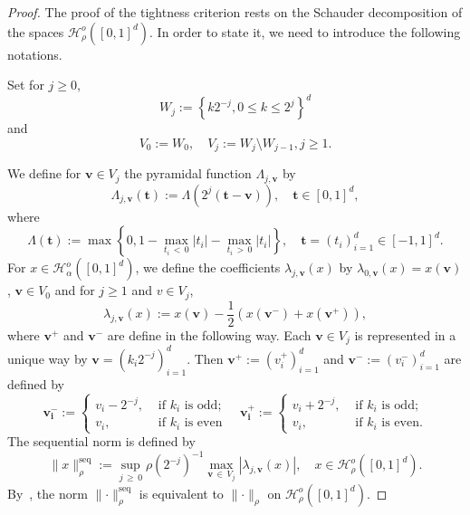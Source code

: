 \documentclass[AHL,Unicode,longabstracts,published]{cedram}
\newcommand{\clH}{\mathcal{H}}
\newcommand{\seq}{\mathrm{seq}}
\newcommand\abs[1]{|#1|}
\newcommand{\norm}[1]{\lVert #1\rVert}
\newcommand{\gr}[1]{\bm{#1}}
\begin{document}
\begin{proof}
The proof of the tightness criterion rests on the Schauder decomposition of the spaces $\clH_\rho^o\left([0,1]^d\right)$. In order to state it, we need to introduce the following notations.

Set for $j\geqslant 0$,
\begin{equation}
W_j:=\left\{k2^{-j},0\leq k\leq 2^j\right\}^d
\end{equation}
and
\begin{equation}
V_0:=W_0, \quad V_j:=W_j\setminus W_{j-1},j\geqslant 1.
\end{equation}

We define for $\gr{v}\in V_j$ the pyramidal function $\Lambda_{j,
\gr{v}}$ by
\begin{equation}
\Lambda_{j,\gr{v}}(\gr{t}):=\Lambda\left(2^j(\gr{t}-\gr{v})\right), \quad
\gr{t}\in [0,1]^d,
\end{equation}
where
\begin{equation}
\Lambda(\gr{t}):=\max\left\{0,1-\max_{t_i\,<\,0}\abs{t_i}-\max_{t_i\,>\,0}\abs{t_i}\right\},
\quad \gr{t}=(t_i)_{i=1}^d\in [-1,1]^d.
\end{equation}
For $x\in \clH_\alpha^o([0,1]^d)$, we define the coefficients $\lambda_{j,\gr{v}}(x)$ by $\lambda_{0,\gr{v}}(x)=x(\gr{v})$, $\gr{v}\in V_0$ and for $j\geqslant 1$ and $v\in V_j$,
\begin{equation}
\lambda_{j,\gr{v}}(x):=x\left(\gr{v}\right)-\frac 12\left(x\left(\gr{v^-}\right)+ x\left(\gr{v^+}\right)\right),
\end{equation}
where $\gr{v^+}$ and $\gr{v^-}$ are define in the following way. Each $\gr{v}\in V_j$ is represented in a unique way by $\gr{v}=
(k_i2^{-j})_{i=1}^d$. Then $\gr{v^+}:=(v^+_i)_{i=1}^d$ and $\gr{v^-}:=(v^-_i)_{i=1}^d$ are defined by
\begin{equation}
\gr{v_i^-}:=
\begin{cases}
v_i-2^{-j},&\text{ if }k_i\text{ is odd;}\\
v_i,&\text{ if }k_i\text{ is even}
\end{cases}\quad
\gr{v_i^+}:=
\begin{cases}
v_i+2^{-j},&\text{ if }k_i\text{ is odd;}\\
v_i,&\text{ if }k_i\text{ is even.}
\end{cases}
\end{equation}
The sequential norm is defined by
\begin{equation}
\norm{x}_\rho^{\seq}:=
\sup_{j\,\geqslant\,0}\rho\left(2^{-j}\right)^{-1}\max_{\gr{v}\,\in\,V_j}
\left|\lambda_{j,\gr{v}}(x)\right|, \quad x\in \clH_\rho^o\left([0,1]^d\right).
\end{equation}
By~\cite{MR2141332}, the norm $\norm{\cdot}_\rho^{\seq}$ is equivalent to $\norm{\cdot}_\rho$ on $\clH_\rho^o([0,1]^d)$.


\end{proof}
\end{document}
